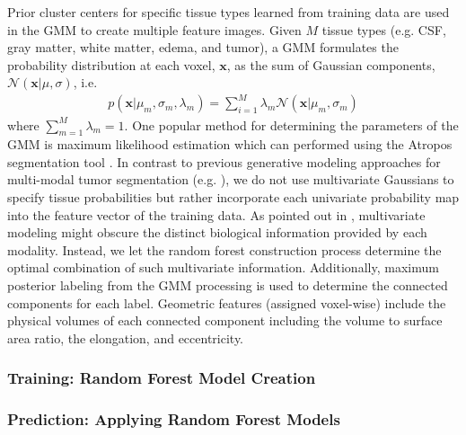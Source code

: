 \documentclass[final,5p,times,twocolumn]{elsarticle}
\begin{document}
Prior  cluster centers for specific tissue types learned from training data \cite{reynolds2009} are used in the GMM to create multiple feature images.  
Given $M$ tissue types (e.g. CSF, gray matter,
white matter, edema, and tumor), a GMM formulates the 
probability distribution at each voxel, $\mathbf{x}$, as the
sum of Gaussian components, $\mathcal{N}(\mathbf{x}|\mu,\sigma)$, i.e.
\begin{align}
p\left(\mathbf{x}|\mu_m,\sigma_m,\lambda_m\right) = \sum_{i=1}^M \lambda_m \mathcal{N}(\mathbf{x}|\mu_m,\sigma_m)
\end{align}
where $\sum_{m=1}^M \lambda_m = 1$.  One popular method for 
determining the parameters of the GMM is maximum likelihood 
estimation which can performed using the Atropos segmentation 
tool \cite{avants2011}.  In contrast to previous generative
modeling approaches for multi-modal tumor segmentation 
(e.g. \cite{prastawa2003}), we do not use multivariate 
Gaussians to specify tissue probabilities but rather incorporate each
univariate probability map into the feature vector of the training
data.  As pointed out in \cite{menze2010}, multivariate modeling
might obscure the distinct biological information provided by each 
modality.  Instead, we let the random forest construction 
process determine the optimal combination of such multivariate
information.
Additionally, maximum posterior labeling from the GMM processing
is used to determine the connected components for each label.  
Geometric features (assigned voxel-wise) include the physical volumes 
of each connected component including the volume to surface area ratio, 
the elongation, and eccentricity. 



\subsubsection{Training:  Random Forest Model Creation}

\subsubsection{Prediction:  Applying Random Forest Models}
\end{document}
